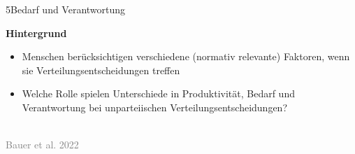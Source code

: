 \documentclass[xcolor=table,9pt,aspectratio=169]{beamer}
\begin{document}
\begin{frame}{\vspace*{10mm}5\hspace*{1em}Bedarf und Verantwortung}
\begin{multicols}{2}
   \textbf{Hintergrund}\\
   \medskip
   \begin{itemize}
      \item Menschen berücksichtigen verschiedene (normativ relevante) Faktoren, wenn sie Verteilungsentscheidungen treffen
      \item Welche Rolle spielen Unterschiede in Produktivität, Bedarf und Verantwortung bei unparteiischen Verteilungsentscheidungen?
   \end{itemize}
   \vfill
   \begin{center}
      \\
      \footnotesize{\textcolor{gray}{Bauer et al. 2022}}
   \end{center}
\end{multicols}
\end{frame}
\end{document}
